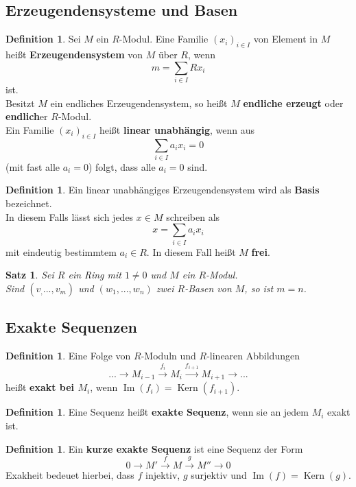 \documentclass[10pt,a4paper]{article}
\newcommand{\Kern}{\operatorname{Kern}}
\newcommand{\Img}{\operatorname{Im}}
\theoremstyle{plain}
\newtheorem{satz}[theorem]{Satz}
\theoremstyle{definition}
\newtheorem{definition}[theorem]{Definition}
\theoremstyle{remark}
\begin{document}
	\subsection{Erzeugendensysteme und Basen}
	\begin{definition}
		Sei $M$ ein $R$-Modul. Eine Familie $(x_i)_{i\in I}$ von Element in $M$ heißt \textbf{Erzeugendensystem} von $M$ über $R$, wenn
		\[m=\sum_{i\in I}Rx_i\]
		ist.\\
		Besitzt $M$ ein endliches Erzeugendensystem, so heißt $M$ \textbf{endliche erzeugt} oder \textbf{endlich}er $R$-Modul.\\
		Ein Familie $(x_i)_{i\in I}$ heißt \textbf{linear unabhängig}, wenn aus
		\[\sum_{i\in I}a_ix_i=0\]
		(mit fast alle $a_i=0$) folgt, dass alle $a_i=0$ sind.
	\end{definition}
	\begin{definition}
		Ein linear unabhängiges Erzeugendensystem wird als \textbf{Basis} bezeichnet.\\
		In diesem Falls lässt sich jedes $x\in M$ schreiben als
		\[x=\sum_{i\in I}a_ix_i\]
		mit eindeutig bestimmtem $a_i\in R$. In diesem Fall heißt $M$ \textbf{frei}.
	\end{definition}

	\begin{satz}
		Sei $R$ ein Ring mit $1\neq 0$ und $M$ ein $R$-Modul.\\
		Sind $(v_,...,v_m)$ und $(w_1,...,w_n)$ zwei $R$-Basen von $M$, so ist $m=n$.
	\end{satz}

	\subsection{Exakte Sequenzen}
	\begin{definition}
		Eine Folge von $R$-Moduln und $R$-linearen Abbildungen
		\[...\to M_{i-1}\xrightarrow{f_i}M_i\xrightarrow{f_{i+1}}M_{i+1}\to...\]
		heißt \textbf{exakt bei $M_i$}, wenn  $\Img(f_i)=\Kern(f_{i+1})$.
	\end{definition}
	
	\begin{definition}
		Eine Sequenz heißt \textbf{exakte Sequenz}, wenn sie an jedem $M_i$ exakt ist.
	\end{definition}

	\begin{definition}
		Ein \textbf{kurze exakte Sequenz} ist eine Sequenz der Form
		\[0\to M'\xrightarrow{f}M\xrightarrow{g}M''\to 0\]
		Exakheit bedeuet hierbei, dass $f$ injektiv, $g$ surjektiv und $\Img(f)=\Kern(g)$.
	\end{definition}
\end{document}

